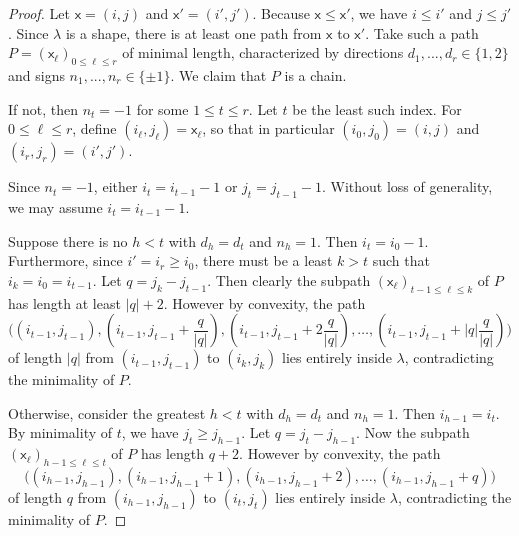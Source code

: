 \documentclass[12pt]{amsart}
\newcommand{\x}{\ensuremath{\mathsf{x}}}
\theoremstyle{definition}
\theoremstyle{remark}
\numberwithin{equation}{section}
\begin{document}
\begin{proof} 
Let $\x = (i,j)$ and $\x' = (i',j')$. Because $\x \leq \x'$, we have $i \leq i'$ and $j \leq j'$. Since $\lambda$ is a shape, there is at least one path from $\x$ to $\x'$. Take such a path $P = (\x_{\ell})_{0\leq \ell \leq r}$ of minimal length, characterized by directions $d_1,...,d_r \in \{ 1,2 \}$ and signs $n_1,...,n_r \in \{ \pm 1\}$.  We claim that $P$ is a chain. 

If not, then $n_t  = -1$ for some $1 \leq t \leq r$. Let $t$ be the least such index. For  $0 \leq \ell \leq r$, define $(i_\ell, j_\ell) = \x_\ell$, so that in particular $(i_0, j_0) = (i,j)$ and $(i_r, j_r) = (i',j')$.


Since $n_t = -1$, either $i_t = i_{t-1} -1$ or $j_t = j_{t-1} -1$.  Without loss of generality, we may assume $i_t = i_{t-1} -1$. 

Suppose there is no $h < t$ with $d_h = d_t$ and $n_h = 1$. Then $i_t = i_0 - 1$. Furthermore, since $i' = i_r \geq i_0$, there must be a least $k > t$ such that $i_k = i_0 = i_{t-1}$. Let $q = j_k - j_{t-1} $. Then clearly the subpath $(\x_{\ell})_{t-1\leq \ell \leq k}$ of $P$ has length at least $|q| + 2$.
However by convexity, the path 
\[
\bigg( (i_{t-1}, j_{t-1}),   (i_{t-1}, j_{t-1} + \frac{q}{|q|}), (i_{t-1}, j_{t-1} + 2\frac{q}{|q|}), \dots , (i_{t-1}, j_{t-1} + |q|\frac{q}{|q|}) \bigg)
\]
of length $|q|$ from $(i_{t-1}, j_{t-1})$ to $(i_k, j_k)$ lies entirely inside $\lambda$, contradicting the minimality of $P$.

Otherwise, consider the greatest $h < t$ with $d_h = d_t$ and $n_h = 1$. Then $i_{h-1} = i_t$. By minimality of $t$, we have $j_t \geq j_{h-1}$. Let $q = j_t - j_{h-1}$. Now the subpath $(\x_{\ell})_{h-1\leq \ell \leq t}$ of $P$ has length $q + 2$. However by convexity, the path 
\[
\big( (i_{h-1}, j_{h-1}),   (i_{h-1}, j_{h-1} + 1), (i_{h-1}, j_{h-1} + 2), \dots , (i_{h-1}, j_{h-1} + q) \big)
\]
of length $q$ from $(i_{h-1}, j_{h-1})$ to $(i_t, j_t)$ lies entirely inside $\lambda$, contradicting the minimality of $P$.
\end{proof}
\end{document}
